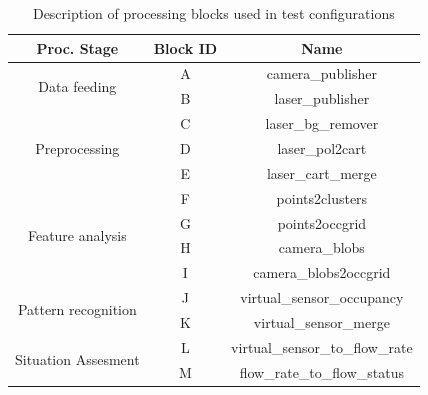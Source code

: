 \begin{table}[ht!]
\footnotesize
\centering
\begin{tabular}{|c | c| c|}
\hline
\textbf{Proc. Stage} & \textbf{Block ID} & \textbf{Name} \\
\hline

\multirow{2}{*}{Data feeding} &
A & camera\_publisher \\
\cline{2-3} 
& B & laser\_publisher \\
\hline

\multirow{3}{*}{Preprocessing} &
C & laser\_bg\_remover \\
\cline{2-3}
& D & laser\_pol2cart \\
\cline{2-3}
& E & laser\_cart\_merge \\
\hline

\multirow{4}{*}{Feature analysis} &
F & points2clusters \\
\cline{2-3}
& G & points2occgrid \\
\cline{2-3}
& H & camera\_blobs \\
\cline{2-3}
& I & camera\_blobs2occgrid \\
\hline

\multirow{2}{*}{Pattern recognition} &
J & virtual\_sensor\_occupancy \\
\cline{2-3}
& K & virtual\_sensor\_merge \\
\hline

\multirow{2}{*}{Situation Assesment} &
L & virtual\_sensor\_to\_flow\_rate \\
\cline{2-3}
& M & flow\_rate\_to\_flow\_status \\
\hline

\end{tabular}
\caption{Description of processing blocks used in test configurations}
\label{desc_test_config}
\end{table}



